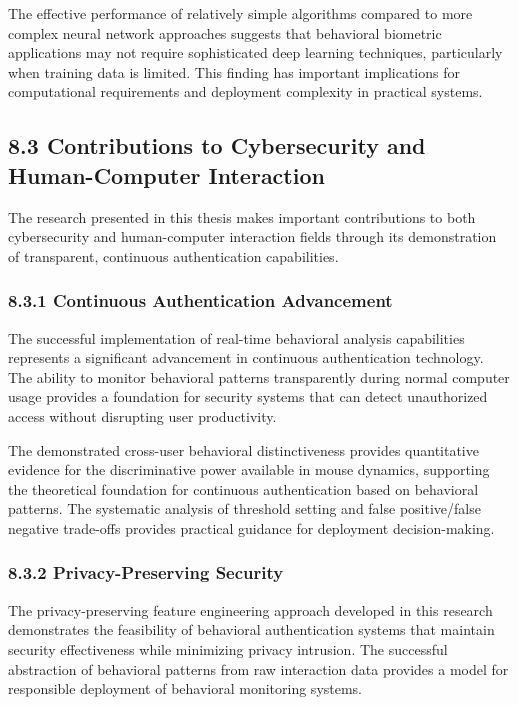 \documentclass[
  11pt,
  a4paper,
]{article}
\begin{document}
The effective performance of relatively simple algorithms compared to
more complex neural network approaches suggests that behavioral
biometric applications may not require sophisticated deep learning
techniques, particularly when training data is limited. This finding has
important implications for computational requirements and deployment
complexity in practical systems.

\subsection{8.3 Contributions to Cybersecurity and Human-Computer
Interaction}\label{contributions-to-cybersecurity-and-human-computer-interaction}

The research presented in this thesis makes important contributions to
both cybersecurity and human-computer interaction fields through its
demonstration of transparent, continuous authentication capabilities.

\subsubsection{8.3.1 Continuous Authentication
Advancement}\label{continuous-authentication-advancement}

The successful implementation of real-time behavioral analysis
capabilities represents a significant advancement in continuous
authentication technology. The ability to monitor behavioral patterns
transparently during normal computer usage provides a foundation for
security systems that can detect unauthorized access without disrupting
user productivity.

The demonstrated cross-user behavioral distinctiveness provides
quantitative evidence for the discriminative power available in mouse
dynamics, supporting the theoretical foundation for continuous
authentication based on behavioral patterns. The systematic analysis of
threshold setting and false positive/false negative trade-offs provides
practical guidance for deployment decision-making.

\subsubsection{8.3.2 Privacy-Preserving
Security}\label{privacy-preserving-security}

The privacy-preserving feature engineering approach developed in this
research demonstrates the feasibility of behavioral authentication
systems that maintain security effectiveness while minimizing privacy
intrusion. The successful abstraction of behavioral patterns from raw
interaction data provides a model for responsible deployment of
behavioral monitoring systems.
\end{document}
